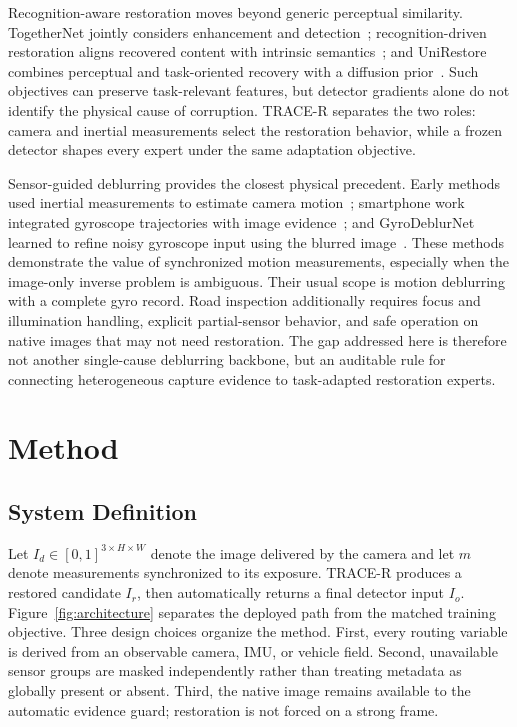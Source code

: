 \documentclass[journal]{IEEEtran}
\begin{document}
Recognition-aware restoration moves beyond generic perceptual similarity. TogetherNet jointly considers enhancement and detection~\cite{wang2022togethernet}; recognition-driven restoration aligns recovered content with intrinsic semantics~\cite{yang2023vrdir}; and UniRestore combines perceptual and task-oriented recovery with a diffusion prior~\cite{chen2025unirestore}. Such objectives can preserve task-relevant features, but detector gradients alone do not identify the physical cause of corruption. TRACE-R separates the two roles: camera and inertial measurements select the restoration behavior, while a frozen detector shapes every expert under the same adaptation objective.

Sensor-guided deblurring provides the closest physical precedent. Early methods used inertial measurements to estimate camera motion~\cite{joshi2010imu}; smartphone work integrated gyroscope trajectories with image evidence~\cite{hu2016smartphoneimu}; and GyroDeblurNet learned to refine noisy gyroscope input using the blurred image~\cite{yang2025gyro}. These methods demonstrate the value of synchronized motion measurements, especially when the image-only inverse problem is ambiguous. Their usual scope is motion deblurring with a complete gyro record. Road inspection additionally requires focus and illumination handling, explicit partial-sensor behavior, and safe operation on native images that may not need restoration. The gap addressed here is therefore not another single-cause deblurring backbone, but an auditable rule for connecting heterogeneous capture evidence to task-adapted restoration experts.

\section{Method}
\subsection{System Definition}
Let $I_d\in[0,1]^{3\times H\times W}$ denote the image delivered by the camera and let $m$ denote measurements synchronized to its exposure. TRACE-R produces a restored candidate $I_r$, then automatically returns a final detector input $I_o$. Figure~\ref{fig:architecture} separates the deployed path from the matched training objective. Three design choices organize the method. First, every routing variable is derived from an observable camera, IMU, or vehicle field. Second, unavailable sensor groups are masked independently rather than treating metadata as globally present or absent. Third, the native image remains available to the automatic evidence guard; restoration is not forced on a strong frame.
\end{document}
